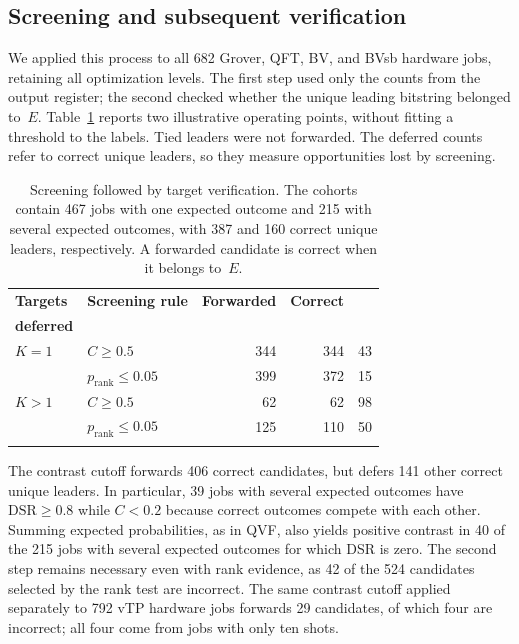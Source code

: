 \documentclass[pdflatex,sn-mathphys-num]{sn-jnl}
\theoremstyle{thmstyleone}%
\theoremstyle{thmstyletwo}%
\theoremstyle{thmstylethree}%
\begin{document}
\subsection{Screening and subsequent verification}\label{subsec:screening-results}

We applied this process to all 682 Grover, QFT, BV, and BVsb hardware jobs, retaining all optimization levels. The first step used only the counts from the output register; the second checked whether the unique leading bitstring belonged to~$E$. Table~\ref{tab:screening} reports two illustrative operating points, without fitting a threshold to the labels. Tied leaders were not forwarded. The deferred counts refer to correct unique leaders, so they measure opportunities lost by screening.

\begin{table}[!htb]
\caption{Screening followed by target verification. The cohorts contain 467 jobs with one expected outcome and 215 with several expected outcomes, with 387 and 160 correct unique leaders, respectively. A forwarded candidate is correct when it belongs to~$E$.}\label{tab:screening}
\centering
\begin{tabular}{@{}llrrr@{}}
\toprule
\textbf{Targets} & \textbf{Screening rule} & \textbf{Forwarded} & \textbf{Correct} & \shortstack{\textbf{Correct}\\\textbf{deferred}} \\
\midrule
$K=1$ & $C\geq0.5$ & 344 & 344 & 43 \\
      & $p_{\mathrm{rank}}\leq0.05$ & 399 & 372 & 15 \\
$K>1$ & $C\geq0.5$ & 62 & 62 & 98 \\
      & $p_{\mathrm{rank}}\leq0.05$ & 125 & 110 & 50 \\
\botrule
\end{tabular}
\end{table}

The contrast cutoff forwards 406 correct candidates, but defers 141 other correct unique leaders. In particular, 39 jobs with several expected outcomes have $\mathrm{DSR}\geq0.8$ while $C<0.2$ because correct outcomes compete with each other. Summing expected probabilities, as in QVF, also yields positive contrast in 40 of the 215 jobs with several expected outcomes for which DSR is zero. The second step remains necessary even with rank evidence, as 42 of the 524 candidates selected by the rank test are incorrect. The same contrast cutoff applied separately to 792 vTP hardware jobs forwards 29 candidates, of which four are incorrect; all four come from jobs with only ten shots.
\end{document}
